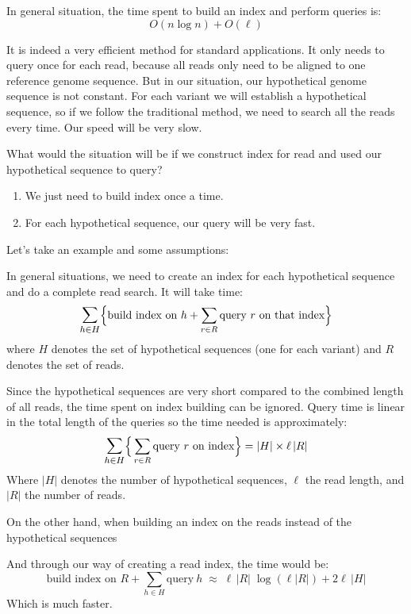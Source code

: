 In general situation, the time spent to build an index and perform queries is:
\begin{equation*}
O(n \log n) + O(\ell)
\end{equation*}

It is indeed a very efficient method for standard applications. It only needs to query once for each read, because all reads only need to be aligned to one reference genome sequence. But in our situation, our hypothetical genome sequence is not constant. For each variant we will establish a hypothetical sequence, so if we follow the traditional method, we need to search all the reads every time. Our speed will be very slow.

What would the situation will be if we construct index for read and used our hypothetical sequence to query?
\begin{enumerate}
\itemsep=0em
\item We just need to build index once a time.
\item For each hypothetical sequence, our query will be very fast.
\end{enumerate}


\noindent Let's take an example and some assumptions:


In general situations, we need to create an index for each hypothetical sequence and do a complete read search. It will take time:
\begin{equation*}
\mathlarger{\sum_{h\in H}} \Big\{ \text{build index on } h + \sum_{r\in R}\text{query}~r~\text{on that index} \Big\}
\end{equation*}
where $H$ denotes the set of hypothetical sequences (one for each variant) and $R$ denotes the set of reads.

\begin{flushleft}
Since the hypothetical sequences are very short compared to the combined length of all reads, the time spent on index building can be ignored.  Query time is linear in the total length of the queries so the time needed is approximately:
\begin{equation*}
\mathlarger{\sum_{h\in H}} \Big\{ \sum_{r\in R}\text{query}~r~\text{on index} \Big\} = |H| \times \ell\,|R|
\end{equation*}
Where $|H|$ denotes the number of hypothetical sequences, $\ell$ the read length, and $|R|$ the number of reads.

On the other hand, when building an index on the reads instead of the hypothetical sequences

And through our way of creating a read index, the time would be:
\begin{equation*}
\text{build index on } R + \sum_{h\in H} \text{query}~h \; \approx \; \ell\,|R|\; \log( \ell|R| ) + 2 \ell\,|H|
\end{equation*}
Which is much faster.
\end{flushleft}

